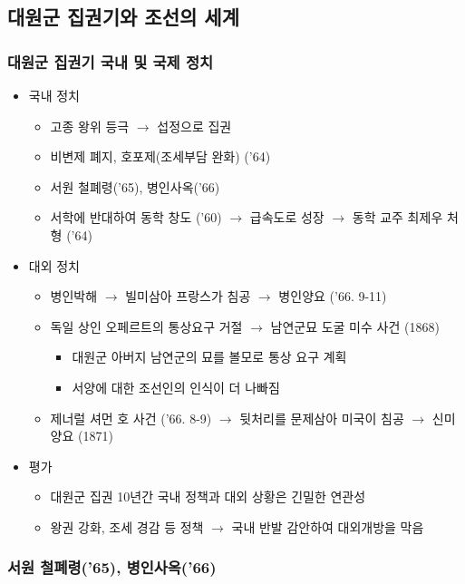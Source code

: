 \subsection{대원군 집권기와 조선의 세계}

\subsubsection*{대원군 집권기 국내 및 국제 정치}
\begin{itemize}
    \item 국내 정치
    \begin{itemize}
        \item 고종 왕위 등극 $\rightarrow$ 섭정으로 집권
        \item 비변제 폐지, 호포제(조세부담 완화) ('64)
        \item 서원 철폐령('65), 병인사옥('66)
        \item 서학에 반대하여 동학 창도 ('60) $\rightarrow$ 급속도로 성장 $\rightarrow$ 동학 교주 최제우 처형 ('64)
    \end{itemize}
    \item 대외 정치
    \begin{itemize}
        \item 병인박해 $\rightarrow$ 빌미삼아 프랑스가 침공 $\rightarrow$ 병인양요 ('66. 9-11)
        \item 독일 상인 오페르트의 통상요구 거절 $\rightarrow$ 남연군묘 도굴 미수 사건 (1868)
        \begin{itemize}
            \item 대원군 아버지 남연군의 묘를 볼모로 통상 요구 계획
            \item 서양에 대한 조선인의 인식이 더 나빠짐
        \end{itemize}
        \item 제너럴 셔먼 호 사건 ('66. 8-9) $\rightarrow$ 뒷처리를 문제삼아 미국이 침공 $\rightarrow$ 신미양요 (1871)
    \end{itemize}
    \item 평가
    \begin{itemize}
        \item 대원군 집권 10년간 국내 정책과 대외 상황은 긴밀한 연관성
        \item 왕권 강화, 조세 경감 등 정책 $\rightarrow$ 국내 반발 감안하여 대외개방을 막음
    \end{itemize}
\end{itemize}

\subsubsection*{서원 철폐령('65), 병인사옥('66)}

